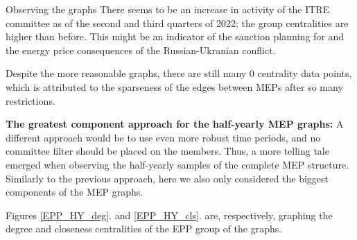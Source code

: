\documentclass[lettersize,journal]{IEEEtran}
\begin{document}
Observing the graphs There seems to be an increase in activity of the ITRE committee as of the second and third quarters of 2022; the group centralities are higher than before. This might be an indicator of the sanction planning for and the energy price consequences of the Russian-Ukranian conflict.

Despite the more reasonable graphs, there are still many 0 centrality data points, which is attributed to the sparseness of the edges between MEPs after so many restrictions. 

\textbf{The greatest component approach for the half-yearly MEP graphs:} A different approach would be to use even more robust time periods, and no committee filter should be placed on the members. Thus, a more telling tale emerged when observing the half-yearly samples of the complete MEP structure. Similarly to the previous approach, here we also only considered the biggest components of the MEP graphs. 

Figures \ref{EPP_HY_deg}. and \ref{EPP_HY_cls}. are, respectively, graphing the degree and closeness centralities of the EPP group of the graphs.
\end{document}
